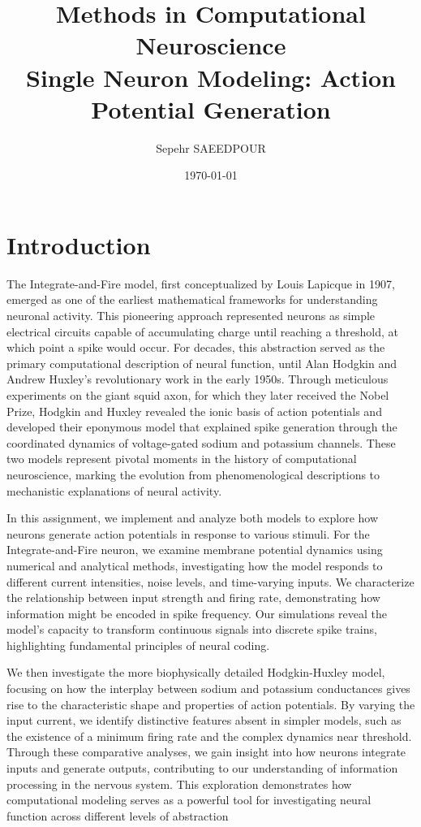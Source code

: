 \documentclass[11pt,a4paper]{article}
\title{Methods in Computational Neuroscience\\
Single Neuron Modeling: Action Potential Generation}
\author{Sepehr SAEEDPOUR}
\date{\today}
\begin{document}
\maketitle

\section*{Introduction}

The Integrate-and-Fire model, first conceptualized by Louis Lapicque in 1907, emerged as one of the earliest mathematical frameworks for understanding neuronal activity. This pioneering approach represented neurons as simple electrical circuits capable of accumulating charge until reaching a threshold, at which point a spike would occur. For decades, this abstraction served as the primary computational description of neural function, until Alan Hodgkin and Andrew Huxley's revolutionary work in the early 1950s. Through meticulous experiments on the giant squid axon, for which they later received the Nobel Prize, Hodgkin and Huxley revealed the ionic basis of action potentials and developed their eponymous model that explained spike generation through the coordinated dynamics of voltage-gated sodium and potassium channels. These two models represent pivotal moments in the history of computational neuroscience, marking the evolution from phenomenological descriptions to mechanistic explanations of neural activity.

In this assignment, we implement and analyze both models to explore how neurons generate action potentials in response to various stimuli. For the Integrate-and-Fire neuron, we examine membrane potential dynamics using numerical and analytical methods, investigating how the model responds to different current intensities, noise levels, and time-varying inputs. We characterize the relationship between input strength and firing rate, demonstrating how information might be encoded in spike frequency. Our simulations reveal the model's capacity to transform continuous signals into discrete spike trains, highlighting fundamental principles of neural coding.

We then investigate the more biophysically detailed Hodgkin-Huxley model, focusing on how the interplay between sodium and potassium conductances gives rise to the characteristic shape and properties of action potentials. By varying the input current, we identify distinctive features absent in simpler models, such as the existence of a minimum firing rate and the complex dynamics near threshold. Through these comparative analyses, we gain insight into how neurons integrate inputs and generate outputs, contributing to our understanding of information processing in the nervous system. This exploration demonstrates how computational modeling serves as a powerful tool for investigating neural function across different levels of abstraction
\end{document}

